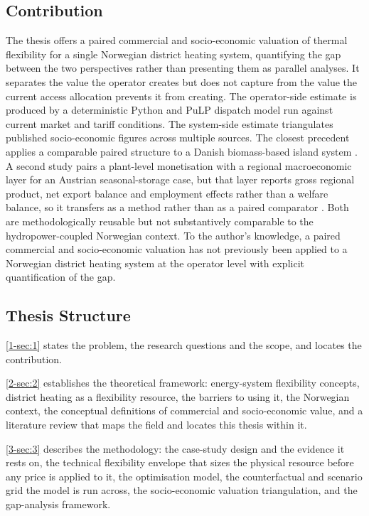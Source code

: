 \subsection{Contribution}
\label{1-subsec:1.5 contribution}
The thesis offers a paired commercial and socio-economic valuation of thermal flexibility for a single Norwegian district heating system, quantifying the gap between the two perspectives rather than presenting them as parallel analyses. It separates the value the operator creates but does not capture from the value the current access allocation prevents it from creating. The operator-side estimate is produced by a deterministic Python and PuLP dispatch model run against current market and tariff conditions. The system-side estimate triangulates published socio-economic figures across multiple sources. The closest precedent applies a comparable paired structure to a Danish biomass-based island system \cite{ostergaard_business_2019}. A second study pairs a plant-level monetisation with a regional macroeconomic layer for an Austrian seasonal-storage case, but that layer reports gross regional product, net export balance and employment effects rather than a welfare balance, so it transfers as a method rather than as a paired comparator \cite{moser_socioeconomic_2018}. Both are methodologically reusable but not substantively comparable to the hydropower-coupled Norwegian context. To the author's knowledge, a paired commercial and socio-economic valuation has not previously been applied to a Norwegian district heating system at the operator level with explicit quantification of the gap.

\subsection{Thesis Structure}
\label{1-subsec:1.6 structure}

\autoref{1-sec:1} states the problem, the research questions and the scope, and locates the contribution.

\autoref{2-sec:2} establishes the theoretical framework: energy-system flexibility concepts, district heating as a flexibility resource, the barriers to using it, the Norwegian context, the conceptual definitions of commercial and socio-economic value, and a literature review that maps the field and locates this thesis within it.

\autoref{3-sec:3} describes the methodology: the case-study design and the evidence it rests on, the technical flexibility envelope that sizes the physical resource before any price is applied to it, the optimisation model, the counterfactual and scenario grid the model is run across, the socio-economic valuation triangulation, and the gap-analysis framework.

